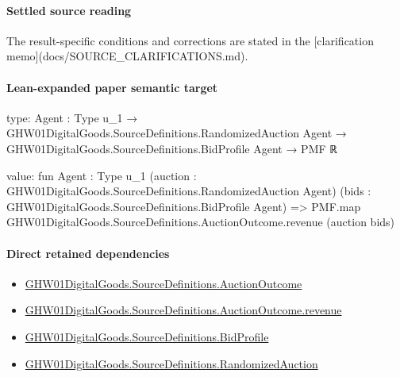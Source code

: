 \documentclass[10pt]{article}
\begin{document}
\paragraph{Settled source reading}
\begin{sloppypar}
The result-\allowbreak{}specific conditions and corrections are stated in the [clarification memo](docs/\allowbreak{}SOURCE\_\allowbreak{}CLARIFICATIONS.\allowbreak{}md).\allowbreak{}
\end{sloppypar}

\paragraph{Lean-expanded paper semantic target}
\begin{ReviewVerbatim}
type:
{Agent : Type u_1} →
  GHW01DigitalGoods.SourceDefinitions.RandomizedAuction Agent →
    GHW01DigitalGoods.SourceDefinitions.BidProfile Agent → PMF ℝ

value:
fun {Agent : Type u_1} (auction : GHW01DigitalGoods.SourceDefinitions.RandomizedAuction Agent)
    (bids : GHW01DigitalGoods.SourceDefinitions.BidProfile Agent) =>
  PMF.map GHW01DigitalGoods.SourceDefinitions.AuctionOutcome.revenue (auction bids)
\end{ReviewVerbatim}

\paragraph{Direct retained dependencies}
\begin{itemize}\raggedright
\item \hyperlink{paper-prerequisite-fc173e8d557afd08}{GHW01\allowbreak{}Digital\allowbreak{}Goods.\allowbreak{}Source\allowbreak{}Definitions.\allowbreak{}Auction\allowbreak{}Outcome}
\item \hyperlink{paper-prerequisite-db810689ed4c35ca}{GHW01\allowbreak{}Digital\allowbreak{}Goods.\allowbreak{}Source\allowbreak{}Definitions.\allowbreak{}Auction\allowbreak{}Outcome.\allowbreak{}revenue}
\item \hyperlink{paper-prerequisite-ac8769d0dccf04f4}{GHW01\allowbreak{}Digital\allowbreak{}Goods.\allowbreak{}Source\allowbreak{}Definitions.\allowbreak{}Bid\allowbreak{}Profile}
\item \hyperlink{paper-prerequisite-093498a5a1839250}{GHW01\allowbreak{}Digital\allowbreak{}Goods.\allowbreak{}Source\allowbreak{}Definitions.\allowbreak{}Randomized\allowbreak{}Auction}
\end{itemize}
\end{document}
